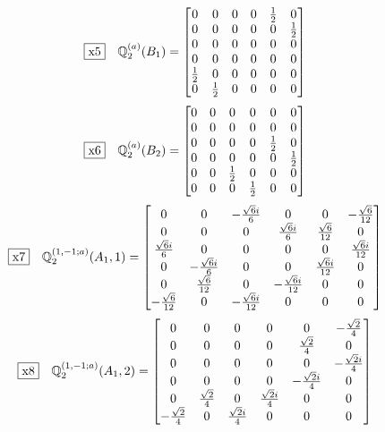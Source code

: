 \documentclass[fleqn,10pt,landscape]{jsarticle}
\begin{document}
\begin{dmath*}
\fbox{x5}\quad \mathbb{Q}_{2}^{(a)}(B_{1})=\begin{bmatrix} 0 & 0 & 0 & 0 & \frac{1}{2} & 0 \\ 0 & 0 & 0 & 0 & 0 & \frac{1}{2} \\ 0 & 0 & 0 & 0 & 0 & 0 \\ 0 & 0 & 0 & 0 & 0 & 0 \\ \frac{1}{2} & 0 & 0 & 0 & 0 & 0 \\ 0 & \frac{1}{2} & 0 & 0 & 0 & 0 \end{bmatrix}
\end{dmath*}
\begin{dmath*}
\fbox{x6}\quad \mathbb{Q}_{2}^{(a)}(B_{2})=\begin{bmatrix} 0 & 0 & 0 & 0 & 0 & 0 \\ 0 & 0 & 0 & 0 & 0 & 0 \\ 0 & 0 & 0 & 0 & \frac{1}{2} & 0 \\ 0 & 0 & 0 & 0 & 0 & \frac{1}{2} \\ 0 & 0 & \frac{1}{2} & 0 & 0 & 0 \\ 0 & 0 & 0 & \frac{1}{2} & 0 & 0 \end{bmatrix}
\end{dmath*}
\begin{dmath*}
\fbox{x7}\quad \mathbb{Q}_{2}^{(1,-1;a)}(A_{1},1)=\begin{bmatrix} 0 & 0 & - \frac{\sqrt{6} i}{6} & 0 & 0 & - \frac{\sqrt{6}}{12} \\ 0 & 0 & 0 & \frac{\sqrt{6} i}{6} & \frac{\sqrt{6}}{12} & 0 \\ \frac{\sqrt{6} i}{6} & 0 & 0 & 0 & 0 & \frac{\sqrt{6} i}{12} \\ 0 & - \frac{\sqrt{6} i}{6} & 0 & 0 & \frac{\sqrt{6} i}{12} & 0 \\ 0 & \frac{\sqrt{6}}{12} & 0 & - \frac{\sqrt{6} i}{12} & 0 & 0 \\ - \frac{\sqrt{6}}{12} & 0 & - \frac{\sqrt{6} i}{12} & 0 & 0 & 0 \end{bmatrix}
\end{dmath*}
\begin{dmath*}
\fbox{x8}\quad \mathbb{Q}_{2}^{(1,-1;a)}(A_{1},2)=\begin{bmatrix} 0 & 0 & 0 & 0 & 0 & - \frac{\sqrt{2}}{4} \\ 0 & 0 & 0 & 0 & \frac{\sqrt{2}}{4} & 0 \\ 0 & 0 & 0 & 0 & 0 & - \frac{\sqrt{2} i}{4} \\ 0 & 0 & 0 & 0 & - \frac{\sqrt{2} i}{4} & 0 \\ 0 & \frac{\sqrt{2}}{4} & 0 & \frac{\sqrt{2} i}{4} & 0 & 0 \\ - \frac{\sqrt{2}}{4} & 0 & \frac{\sqrt{2} i}{4} & 0 & 0 & 0 \end{bmatrix}
\end{dmath*}
\end{document}
